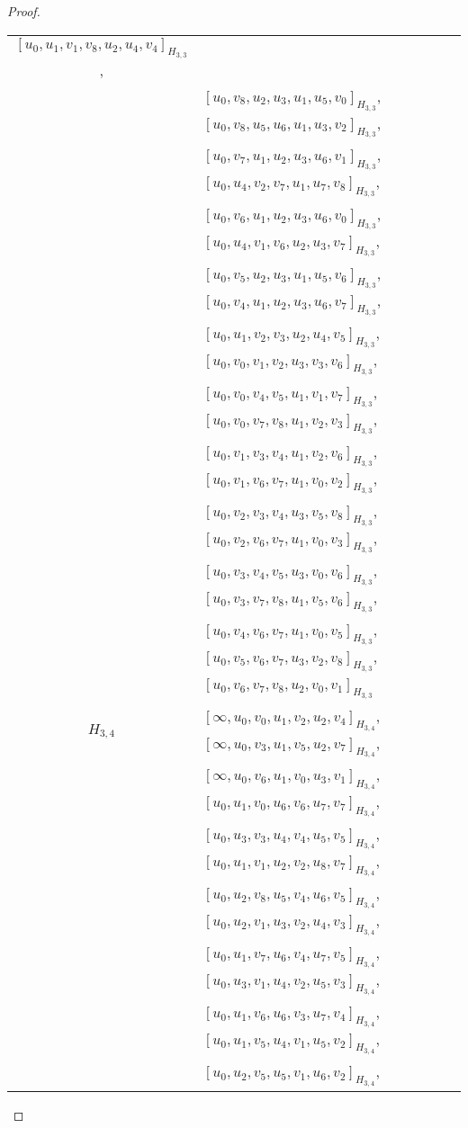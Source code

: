 \begin{subappendices}
\begin{proof}
{\begin{longtable}{|c|l|}
  $[u_0, u_1, v_1, v_8, u_2, u_4, v_4]_{H_{3,3}}$, \\* &
  $[u_0, v_8, u_2, u_3, u_1, u_5, v_0]_{H_{3,3}}$,
  $[u_0, v_8, u_5, u_6, u_1, u_3, v_2]_{H_{3,3}}$, \\* &
  $[u_0, v_7, u_1, u_2, u_3, u_6, v_1]_{H_{3,3}}$,
  $[u_0, u_4, v_2, v_7, u_1, u_7, v_8]_{H_{3,3}}$, \\* &
  $[u_0, v_6, u_1, u_2, u_3, u_6, v_0]_{H_{3,3}}$,
  $[u_0, u_4, v_1, v_6, u_2, u_3, v_7]_{H_{3,3}}$, \\* &
  $[u_0, v_5, u_2, u_3, u_1, u_5, v_6]_{H_{3,3}}$,
  $[u_0, v_4, u_1, u_2, u_3, u_6, v_7]_{H_{3,3}}$, \\* &
  $[u_0, u_1, v_2, v_3, u_2, u_4, v_5]_{H_{3,3}}$,
  $[u_0, v_0, v_1, v_2, u_3, v_3, v_6]_{H_{3,3}}$, \\* &
  $[u_0, v_0, v_4, v_5, u_1, v_1, v_7]_{H_{3,3}}$,
  $[u_0, v_0, v_7, v_8, u_1, v_2, v_3]_{H_{3,3}}$, \\* &
  $[u_0, v_1, v_3, v_4, u_1, v_2, v_6]_{H_{3,3}}$,
  $[u_0, v_1, v_6, v_7, u_1, v_0, v_2]_{H_{3,3}}$, \\* &
  $[u_0, v_2, v_3, v_4, u_3, v_5, v_8]_{H_{3,3}}$,
  $[u_0, v_2, v_6, v_7, u_1, v_0, v_3]_{H_{3,3}}$, \\* &
  $[u_0, v_3, v_4, v_5, u_3, v_0, v_6]_{H_{3,3}}$,
  $[u_0, v_3, v_7, v_8, u_1, v_5, v_6]_{H_{3,3}}$, \\* &
  $[u_0, v_4, v_6, v_7, u_1, v_0, v_5]_{H_{3,3}}$,
  $[u_0, v_5, v_6, v_7, u_3, v_2, v_8]_{H_{3,3}}$, \\* &
  $[u_0, v_6, v_7, v_8, u_2, v_0, v_1]_{H_{3,3}}$
\\ \hline
$H_{3,4}$ &
  $[\infty, u_0, v_0, u_1, v_2, u_2, v_4]_{H_{3,4}}$,
  $[\infty, u_0, v_3, u_1, v_5, u_2, v_7]_{H_{3,4}}$, \\* &
  $[\infty, u_0, v_6, u_1, v_0, u_3, v_1]_{H_{3,4}}$,
  $[u_0, u_1, v_0, u_6, v_6, u_7, v_7]_{H_{3,4}}$, \\* &
  $[u_0, u_3, v_3, u_4, v_4, u_5, v_5]_{H_{3,4}}$,
  $[u_0, u_1, v_1, u_2, v_2, u_8, v_7]_{H_{3,4}}$, \\* &
  $[u_0, u_2, v_8, u_5, v_4, u_6, v_5]_{H_{3,4}}$,
  $[u_0, u_2, v_1, u_3, v_2, u_4, v_3]_{H_{3,4}}$, \\* &
  $[u_0, u_1, v_7, u_6, v_4, u_7, v_5]_{H_{3,4}}$,
  $[u_0, u_3, v_1, u_4, v_2, u_5, v_3]_{H_{3,4}}$, \\* &
  $[u_0, u_1, v_6, u_6, v_3, u_7, v_4]_{H_{3,4}}$,
  $[u_0, u_1, v_5, u_4, v_1, u_5, v_2]_{H_{3,4}}$, \\* &
  $[u_0, u_2, v_5, u_5, v_1, u_6, v_2]_{H_{3,4}}$,

\end{longtable}}
\end{proof}
\end{subappendices}
